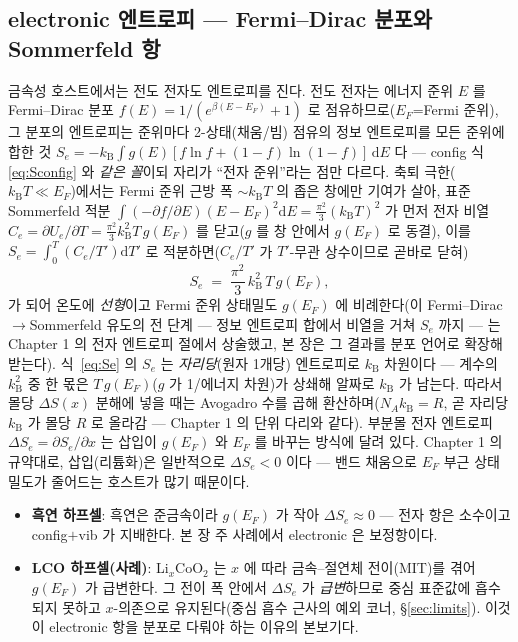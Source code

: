 \documentclass[11pt,a4paper]{article}
\newcommand{\dd}{\mathrm{d}}
\newcommand{\kB}{k_{\mathrm B}}
\begin{document}
\subsection{electronic 엔트로피 — Fermi--Dirac 분포와 Sommerfeld 항}\label{ssec:elec}
금속성 호스트에서는 전도 전자도 엔트로피를 진다. 전도 전자는 에너지 준위 $E$ 를 Fermi--Dirac 분포
$f(E)=1/(e^{\beta(E-E_F)}+1)$ 로 점유하므로($E_F$=Fermi 준위), 그 분포의 엔트로피는 준위마다 2-상태(채움/빔)
점유의 정보 엔트로피를 모든 준위에 합한 것 $S_e=-\kB\int g(E)[f\ln f+(1-f)\ln(1-f)]\,\dd E$ 다 — config 식
\eqref{eq:Sconfig} 와 \emph{같은 꼴}이되 자리가 ``전자 준위''라는 점만 다르다. 축퇴 극한($\kB T\ll E_F$)에서는
Fermi 준위 근방 폭 $\sim\kB T$ 의 좁은 창에만 기여가 살아, 표준 Sommerfeld 적분
$\int(-\partial f/\partial E)(E-E_F)^2\dd E=\tfrac{\pi^2}{3}(\kB T)^2$ 가 먼저 전자 비열 $C_e=\partial U_e/\partial T
=\tfrac{\pi^2}{3}\kB^2T\,g(E_F)$ 를 닫고($g$ 를 창 안에서 $g(E_F)$ 로 동결), 이를 $S_e=\int_0^T(C_e/T')\dd T'$ 로
적분하면($C_e/T'$ 가 $T'$-무관 상수이므로 곧바로 닫혀)
\begin{equation}
S_e \;=\; \frac{\pi^2}{3}\,\kB^2\,T\,g(E_F),
\label{eq:Se}
\end{equation}
가 되어 온도에 \emph{선형}이고 Fermi 준위 상태밀도 $g(E_F)$ 에 비례한다(이 Fermi--Dirac$\to$Sommerfeld
유도의 전 단계 — 정보 엔트로피 합에서 비열을 거쳐 $S_e$ 까지 — 는 Chapter 1 의 전자 엔트로피 절에서 상술했고,
본 장은 그 결과를 분포 언어로 확장해 받는다). 식~\eqref{eq:Se} 의 $S_e$ 는 \emph{자리당}(원자 1개당) 엔트로피로
$\kB$ 차원이다 — 계수의 $\kB^2$ 중 한 몫은 $T\,g(E_F)$($g$ 가 1/에너지 차원)가 상쇄해 알짜로 $\kB$ 가 남는다.
따라서 몰당 $\Delta S(x)$ 분해에 넣을 때는 Avogadro 수를 곱해 환산하며($N_A\kB=R$, 곧 자리당 $\kB$ 가 몰당 $R$ 로
올라감 — Chapter 1 의 단위 다리와 같다). 부분몰 전자 엔트로피
$\Delta S_e=\partial S_e/\partial x$ 는 삽입이 $g(E_F)$ 와 $E_F$ 를 바꾸는 방식에 달려 있다. Chapter 1 의
규약대로, 삽입(리튬화)은 일반적으로 $\Delta S_e<0$ 이다 — 밴드 채움으로 $E_F$ 부근 상태밀도가 줄어드는 호스트가
많기 때문이다.
\begin{itemize}[leftmargin=1.4em,itemsep=1pt]
\item \textbf{흑연 하프셀}: 흑연은 준금속이라 $g(E_F)$ 가 작아 $\Delta S_e\approx0$ — 전자 항은 소수이고
config$+$vib 가 지배한다. 본 장 주 사례에서 electronic 은 보정항이다.
\item \textbf{LCO 하프셀(사례)}: Li$_x$CoO$_2$ 는 $x$ 에 따라 금속--절연체 전이(MIT)를 겪어 $g(E_F)$ 가
급변한다. 그 전이 폭 안에서 $\Delta S_e$ 가 \emph{급변}하므로 중심 표준값에 흡수되지 못하고 $x$-의존으로
유지된다(중심 흡수 근사의 예외 코너, \S\ref{sec:limits}). 이것이 electronic 항을 분포로 다뤄야 하는 이유의 본보기다.
\end{itemize}
\end{document}
